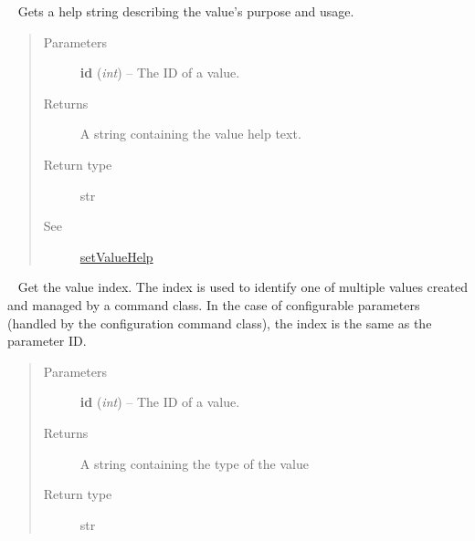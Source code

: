 \documentclass[letterpaper,10pt,english]{sphinxmanual}
\begin{document}
\begin{fulllineitems}
\begin{fulllineitems}
\begin{quote}
\begin{description}
\end{description}\end{quote}

\end{fulllineitems}


\begin{fulllineitems}
\label{libopenzwave:libopenzwave.PyManager.getValueHelp}~\label{libopenzwave:getvaluehelp}
Gets a help string describing the value's purpose and usage.
\begin{quote}\begin{description}
\item[{Parameters}] \leavevmode
\textbf{id} (\emph{int}) -- The ID of a value.

\item[{Returns}] \leavevmode
A string containing the value help text.

\item[{Return type}] \leavevmode
str

\item[{See}] \leavevmode
{\hyperref[libopenzwave:setvaluehelp]{setValueHelp}}

\end{description}\end{quote}

\end{fulllineitems}


\begin{fulllineitems}
\label{libopenzwave:libopenzwave.PyManager.getValueIndex}~\label{libopenzwave:getvalueindex}
Get the value index.  The index is used to identify one of multiple
values created and managed by a command class.  In the case of configurable
parameters (handled by the configuration command class), the index is the
same as the parameter ID.
\begin{quote}\begin{description}
\item[{Parameters}] \leavevmode
\textbf{id} (\emph{int}) -- The ID of a value.

\item[{Returns}] \leavevmode
A string containing the type of the value

\item[{Return type}] \leavevmode
str


\end{description}
\end{quote}
\end{fulllineitems}
\end{fulllineitems}
\end{document}

